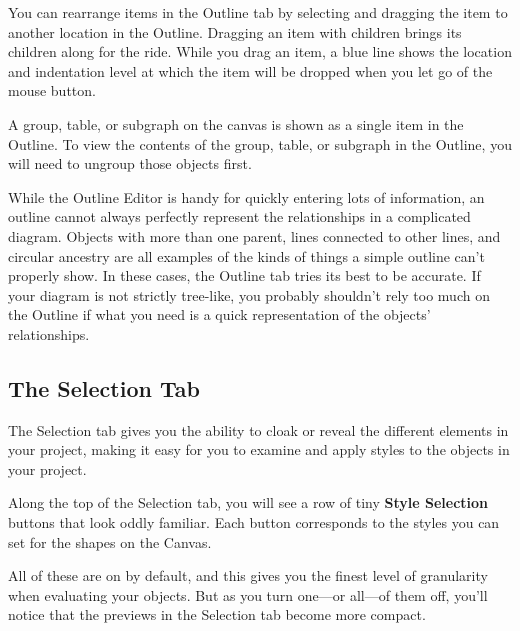 \documentclass[../main.tex]{subfiles}
\begin{document}
You can rearrange items in the Outline tab by selecting and dragging the item to another
location in the Outline. Dragging an item with children brings its children along for the
ride. While you drag an item, a blue line shows the location and indentation level at which
the item will be dropped when you let go of the mouse button.


A group, table, or subgraph on the canvas is shown as a single item in the Outline. To view the
contents of the group, table, or subgraph in the Outline, you will need to ungroup those
objects first.

While the Outline Editor is handy for quickly entering lots of information, an outline cannot
always perfectly represent the relationships in a complicated diagram. Objects with more than
one parent, lines connected to other lines, and circular ancestry are all examples of the
kinds of things a simple outline can't properly show. In these cases, the Outline tab tries
its best to be accurate. If your diagram is not strictly tree-like, you probably shouldn't
rely too much on the Outline if what you need is a quick representation of the objects'
relationships.

\subsection{The Selection Tab }

The Selection tab gives you the ability to cloak or reveal the different elements in your
project, making it easy for you to examine and apply styles to the objects in your project.


Along the top of the Selection tab, you will see a row of tiny \textbf{Style Selection} buttons
that look oddly familiar. Each button corresponds to the styles you can set for the shapes on
the Canvas.


All of these are on by default, and this gives you the finest level of granularity when
evaluating your objects. But as you turn one---or all---of them off, you'll notice that the
previews in the Selection tab become more compact.

\end{document}
